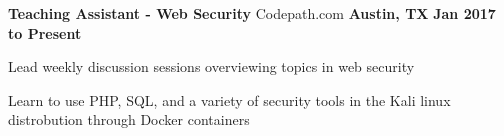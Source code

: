 \begin{cventries}
	\cventry
		{\normalsize \textbf{Teaching Assistant - Web Security}}
		{\large Codepath.com}
		{\normalsize \textbf{Austin, TX}}
		{\normalsize \textbf{Jan 2017 to Present}}
		{
			\begin{cvitems}
				\item {\normalsize Lead weekly discussion sessions overviewing topics in web security}
                \item {\normalsize Learn to use PHP, SQL, and a variety of security tools in the Kali linux distrobution through Docker containers} 
			\end{cvitems}
		}
\end{cventries}
